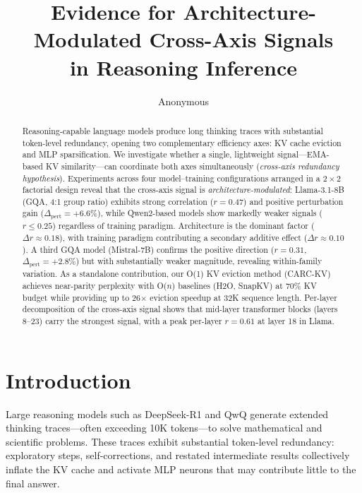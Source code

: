 \documentclass[11pt,a4paper]{article}
\title{Evidence for Architecture-Modulated Cross-Axis Signals\\in Reasoning Inference}
\author{Anonymous}
\begin{document}
\maketitle

\begin{abstract}
Reasoning-capable language models produce long thinking traces with substantial token-level redundancy, opening two complementary efficiency axes: KV cache eviction and MLP sparsification.
We investigate whether a single, lightweight signal---EMA-based KV similarity---can coordinate both axes simultaneously (\emph{cross-axis redundancy hypothesis}).
Experiments across four model--training configurations arranged in a $2\times 2$ factorial design reveal that the cross-axis signal is \emph{architecture-modulated}: Llama-3.1-8B (GQA, 4:1 group ratio) exhibits strong correlation ($r{=}0.47$) and positive perturbation gain ($\Delta_\text{pert}{=}{+}6.6\%$), while Qwen2-based models show markedly weaker signals ($r{\le}0.25$) regardless of training paradigm.
Architecture is the dominant factor ($\Delta r{\approx}0.18$), with training paradigm contributing a secondary additive effect ($\Delta r{\approx}0.10$).
A third GQA model (Mistral-7B) confirms the positive direction ($r{=}0.31$, $\Delta_\text{pert}{=}{+}2.8\%$) but with substantially weaker magnitude, revealing within-family variation.
As a standalone contribution, our O(1) KV eviction method (CARC-KV) achieves near-parity perplexity with O($n$) baselines (H2O, SnapKV) at 70\% KV budget while providing up to 26$\times$ eviction speedup at 32K sequence length.
Per-layer decomposition of the cross-axis signal shows that mid-layer transformer blocks (layers 8--23) carry the strongest signal, with a peak per-layer $r{=}0.61$ at layer 18 in Llama.
\end{abstract}

\section{Introduction}
\label{sec:intro}

Large reasoning models such as DeepSeek-R1 \cite{deepseekai2025deepseekr1} and QwQ \cite{qwq32b} generate extended thinking traces---often exceeding 10K tokens---to solve mathematical and scientific problems.
These traces exhibit substantial token-level redundancy: exploratory steps, self-corrections, and restated intermediate results collectively inflate the KV cache and activate MLP neurons that may contribute little to the final answer.
\end{document}
